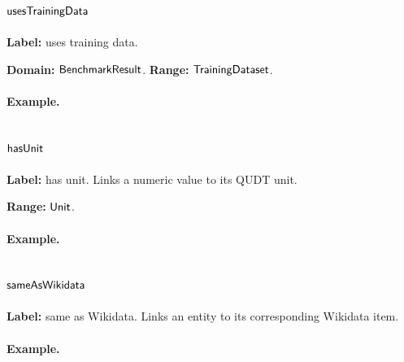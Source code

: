 \subsection{$\mathsf{usesTrainingData}$}
\label{sec:term-usesTrainingData}

\textbf{Label:} uses training data.

\textbf{Domain:} $\mathsf{BenchmarkResult}$.
\textbf{Range:} $\mathsf{TrainingDataset}$.

\paragraph{Example.}

\subsection{$\mathsf{hasUnit}$}
\label{sec:term-hasUnit}

\textbf{Label:} has unit.
Links a numeric value to its QUDT unit.

\textbf{Range:} $\mathsf{Unit}$.

\paragraph{Example.}

\subsection{$\mathsf{sameAsWikidata}$}
\label{sec:term-sameAsWikidata}

\textbf{Label:} same as Wikidata.
Links an entity to its corresponding Wikidata item.

\paragraph{Example.}


